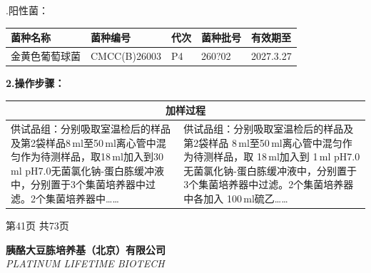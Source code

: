 \documentclass[UTF8,10pt,a4paper,fontset=fandol]{ctexart}
\newcommand{\fieldvalue}[1]{#1}
\newcommand{\handwritten}[1]{#1}
\begin{document}
\medskip
{}.\quad 阳性菌：

\begin{tabular}{|p{4.2cm}|p{3.4cm}|p{2.1cm}|p{2.5cm}|p{2.5cm}|}
\hline
菌种名称 & 菌种编号 & 代次 & 菌种批号 & 有效期至\\
\hline
金黄色葡萄球菌 &
\fieldvalue{\handwritten{CMCC(B)26003}} &
\fieldvalue{\handwritten{P4}} &
\fieldvalue{\handwritten{260?02}} &
\fieldvalue{\handwritten{2027.3.27}}\\
\hline
\end{tabular}

\medskip
\noindent\textbf{2.\quad 操作步骤：}

\begin{tabular}{|p{7.0cm}|p{7.0cm}|}
\hline
\multicolumn{2}{|c|}{加样过程}\\
\hline
供试品组：分别吸取室温检后的样品及第2袋样品8\,ml至50\,ml离心管中混匀作为待测样品，取18\,ml加入到30\,ml pH7.0无菌氯化钠-蛋白胨缓冲液中，分别置于3个集菌培养器中过滤。2个集菌培养器中…… &
供试品组：分别吸取室温检后的样品及第2袋样品
\fieldvalue{\handwritten{8}}\,ml至50\,ml离心管中混匀作为待测样品，取
\fieldvalue{\handwritten{18}}\,ml加入到
\fieldvalue{\handwritten{1}}\,ml pH7.0无菌氯化钠-蛋白胨缓冲液中，分别置于3个集菌培养器中过滤。2个集菌培养器中各加入
\fieldvalue{\handwritten{100}}\,ml硫乙……\\
\hline
\end{tabular}

\begin{center}
第41页 共73页
\end{center}


\newpage

\noindent
\textbf{胰酪大豆胨培养基（北京）有限公司}\\
\textit{PLATINUM LIFETIME BIOTECH}
\end{document}
